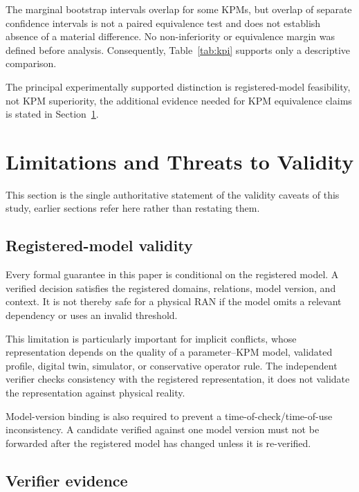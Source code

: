 \documentclass[pdflatex,sn-mathphys-num,iicol,oneside]{sn-jnl}
\begin{document}
The marginal bootstrap intervals overlap for some KPMs, but overlap
of separate confidence intervals is not a paired equivalence test and
does not establish absence of a material difference. No
non-inferiority or equivalence margin was defined before analysis.
Consequently, Table~\ref{tab:kpi} supports only a descriptive
comparison.

The principal experimentally supported distinction is registered-model
feasibility, not KPM superiority, the additional evidence needed for
KPM equivalence claims is stated in Section~\ref{sec:limitations}.

\section{Limitations and Threats to Validity}
\label{sec:limitations}

This section is the single authoritative statement of the validity
caveats of this study, earlier sections refer here rather than
restating them.

\subsection{Registered-model validity}

Every formal guarantee in this paper is conditional on the registered
model. A verified decision satisfies the registered domains,
relations, model version, and context. It is not thereby safe for a
physical RAN if the model omits a relevant dependency or uses an
invalid threshold.

This limitation is particularly important for implicit conflicts,
whose representation depends on the quality of a parameter--KPM
model, validated profile, digital twin, simulator, or conservative
operator rule. The independent verifier checks consistency with the
registered representation, it does not validate the representation
against physical reality.

Model-version binding is also required to prevent a
time-of-check/time-of-use inconsistency. A candidate verified against
one model version must not be forwarded after the registered model
has changed unless it is re-verified.

\subsection{Verifier evidence}
\end{document}

